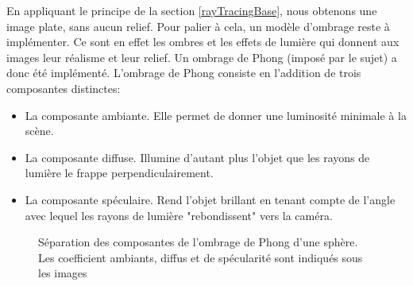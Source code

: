 \documentclass[../../Rapport RayTracer.tex]{subfiles}
\begin{document}
En appliquant le principe de la section \ref{rayTracingBase}, nous obtenons une image plate, sans aucun relief. Pour palier à cela, un modèle d'ombrage reste à implémenter. Ce sont en effet les ombres et les effets de lumière qui donnent aux images leur réalisme et leur relief. Un ombrage de Phong (imposé par le sujet) a donc été implémenté. L'ombrage de Phong consiste en l'addition de trois composantes distinctes:
\begin{itemize}
	\item {La composante ambiante. Elle permet de donner une luminosité minimale à la scène.}
	\item {La composante diffuse. Illumine d'autant plus l'objet que les rayons de lumière le frappe perpendiculairement.}
	\item {La composante spéculaire. Rend l'objet brillant en tenant compte de l'angle avec lequel les rayons de lumière "rebondissent" vers la caméra.}
\end{itemize}

\begin{figure}[h!]

	\caption{Séparation des composantes de l'ombrage de Phong d'une sphère. Les coefficient ambiants, diffus et de spécularité sont indiqués sous les images}
	\label{finalPhong}
\end{figure}
\FloatBarrier
\end{document}

